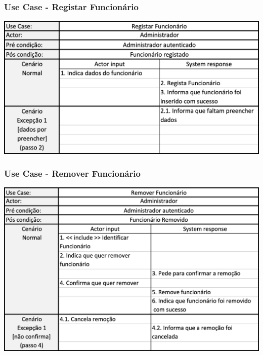\subsubsection{Use Case - Registar Funcionário}
\begin{center}
 	\includegraphics[width = 5.5in]{D_E_USECASE/uc_registar_funcionario.png}
\end{center}
\subsubsection{Use Case - Remover Funcionário}
\begin{center}
 	\includegraphics[width = 5.5in]{D_E_USECASE/uc_remover_funcionario.png}
\end{center}
